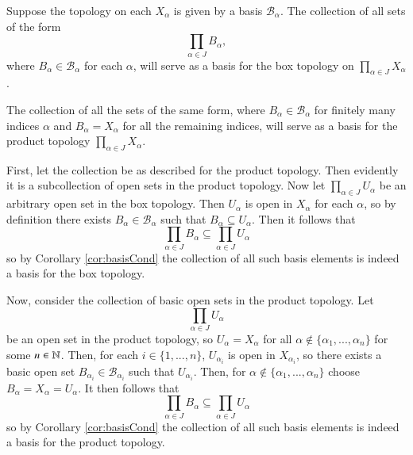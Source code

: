 \documentclass[12pt, a4paper, twoside, openright, titlepage]{book}
\begin{document}
\begin{thm}{}{}
    Suppose the topology on each $X_{\alpha}$ is given by a basis $\mathcal{B}_{\alpha}$. The collection of all sets of the form \begin{equation*}
        \prod\limits_{\alpha \in J}B_{\alpha},
    \end{equation*}
    where $B_{\alpha} \in \mathcal{B}_{\alpha}$ for each $\alpha$, will serve as a basis for the box topology on $\prod_{\alpha \in J}X_{\alpha}$.

    The collection of all the sets of the same form, where $B_{\alpha} \in \mathcal{B}_{\alpha}$ for finitely many indices $\alpha$ and $B_{\alpha} = X_{\alpha}$ for all the remaining indices, will serve as a basis for the product topology $\prod_{\alpha \in J}X_{\alpha}$.
\end{thm}
\begin{proof*}{}{}
    First, let the collection be as described for the product topology. Then evidently it is a subcollection of open sets in the product topology. Now let $\prod_{\alpha \in J}U_{\alpha}$ be an arbitrary open set in the box topology. Then $U_{\alpha}$ is open in $X_{\alpha}$ for each $\alpha$, so by definition there exists $B_{\alpha} \in \mathcal{B}_{\alpha}$ such that $B_{\alpha} \subseteq U_{\alpha}$. Then it follows that \begin{equation*}
        \prod\limits_{\alpha \in J}B_{\alpha} \subseteq \prod\limits_{\alpha \in J}U_{\alpha}
    \end{equation*}
    so by Corollary \ref{cor:basisCond} the collection of all such basis elements is indeed a basis for the box topology.

    Now, consider the collection of basic open sets in the product topology. Let $$\prod\limits_{\alpha \in J}U_{\alpha}$$ be an open set in the product topology, so $U_{\alpha} = X_{\alpha}$ for all $\alpha \notin \{\alpha_1,...,\alpha_n\}$ for some $n \in \mathbb N$. Then, for each $i \in \{1,...,n\}$, $U_{\alpha_i}$ is open in $X_{\alpha_i}$, so there exists a basic open set $B_{\alpha_i} \in \mathcal{B}_{\alpha_i}$ such that $U_{\alpha_i}$. Then, for $\alpha \notin \{\alpha_1,...,\alpha_n\}$ choose $B_{\alpha} = X_{\alpha} = U_{\alpha}$. It then follows that \begin{equation*}
        \prod\limits_{\alpha \in J}B_{\alpha} \subseteq \prod\limits_{\alpha \in J}U_{\alpha}
    \end{equation*}
    so by Corollary \ref{cor:basisCond} the collection of all such basis elements is indeed a basis for the product topology.
\end{proof*}
\end{document}
